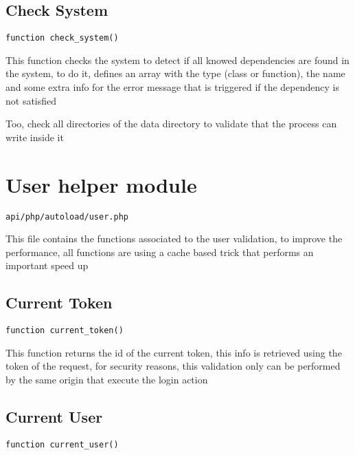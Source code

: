 \documentclass[a4paper]{book}
\begin{document}
\hypertarget{toc280}{}
\subsection{Check System}

\begin{lstlisting}
function check_system()
\end{lstlisting}

This function checks the system to detect if all knowed dependencies are found in the system, to do it,
defines an array with the type (class or function), the name and some extra info for the error message
that is triggered if the dependency is not satisfied

Too, check all directories of the data directory to validate that the process can write inside it

\hypertarget{toc281}{}
\section{User helper module}

\begin{lstlisting}
api/php/autoload/user.php
\end{lstlisting}

This file contains the functions associated to the user validation, to
improve the performance, all functions are using a cache based trick
that performs an important speed up

\hypertarget{toc282}{}
\subsection{Current Token}

\begin{lstlisting}
function current_token()
\end{lstlisting}

This function returns the id of the current token, this info is retrieved
using the token of the request, for security reasons, this validation only
can be performed by the same origin that execute the login action

\hypertarget{toc283}{}
\subsection{Current User}

\begin{lstlisting}
function current_user()
\end{lstlisting}
\end{document}

